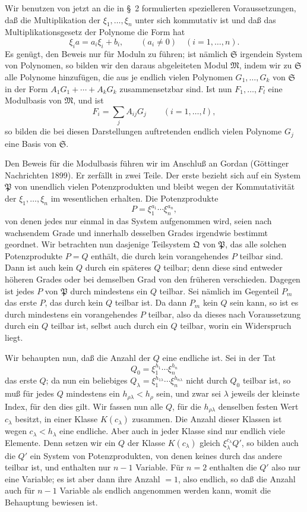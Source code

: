 \documentclass[11pt]{article}
\newcommand{\mM}{\mathfrak{M}}
\providecommand{\mP}{\mathfrak{P}}
\providecommand{\mQ}{\mathfrak{Q}}
\providecommand{\mS}{\mathfrak{S}}
\begin{document}
Wir benutzen von jetzt an die in \S~2 formulierten spezielleren Voraussetzungen, daß die Multiplikation der $\xi_1,\ldots,\xi_n$ unter sich kommutativ ist und daß das Multiplikationsgesetz der Polynome die Form hat
\begin{equation}
 \xi_i a=a_i\xi_i+b_i,
 \qquad (a_i\ne0)\quad(i=1,\ldots,n).
\tag{6}
\end{equation}
Es genügt, den Beweis nur für Moduln zu führen; ist nämlich $\mS$ irgendein System von Polynomen, so bilden wir den daraus abgeleiteten Modul $\mM$, indem wir zu $\mS$ alle Polynome hinzufügen, die aus je endlich vielen Polynomen $G_1,
\ldots,G_k$ von $\mS$ in der Form $A_1G_1+
\cdots+A_kG_k$ zusammensetzbar sind. Ist nun $F_1,\ldots,F_l$ eine Modulbasis von $\mM$, und ist
\[
 F_i=\sum_j A_{ij}G_j\qquad(i=1,\ldots,l),
\]
so bilden die bei diesen Darstellungen auftretenden endlich vielen Polynome $G_j$ eine Basis von $\mS$.

Den Beweis für die Modulbasis führen wir im Anschluß an Gordan (Göttinger Nachrichten 1899). Er zerfällt in zwei Teile. Der erste bezieht sich auf ein System $\mP$ von unendlich vielen Potenzprodukten und bleibt wegen der Kommutativität der $\xi_1,\ldots,\xi_n$ im wesentlichen erhalten. Die Potenzprodukte
\[
 P=\xi_1^{a_1}\cdots\xi_n^{a_n},
\]
von denen jedes nur einmal in das System aufgenommen wird, seien nach wachsendem Grade und innerhalb desselben Grades irgendwie bestimmt geordnet. Wir betrachten nun dasjenige Teilsystem $\mQ$ von $\mP$, das alle solchen Potenzprodukte $P=Q$ enthält, die durch kein vorangehendes $P$ teilbar sind. Dann ist auch kein $Q$ durch ein späteres $Q$ teilbar; denn diese sind entweder höheren Grades oder bei demselben Grad von den früheren verschieden. Dagegen ist jedes $P$ von $\mP$ durch mindestens ein $Q$ teilbar. Sei nämlich im Gegenteil $P_m$ das erste $P$, das durch kein $Q$ teilbar ist. Da dann $P_m$ kein $Q$ sein kann, so ist es durch mindestens ein vorangehendes $P$ teilbar, also da dieses nach Voraussetzung durch ein $Q$ teilbar ist, selbst auch durch ein $Q$ teilbar, worin ein Widerspruch liegt.

Wir behaupten nun, daß die Anzahl der $Q$ eine endliche ist. Sei in der Tat
\[
 Q_0=\xi_1^{h_1}\cdots\xi_n^{h_n}
\]
das erste $Q$; da nun ein beliebiges $Q_\lambda=\xi_1^{h_{1\lambda}}\cdots\xi_n^{h_{n\lambda}}$ nicht durch $Q_0$ teilbar ist, so muß für jedes $Q$ mindestens ein $h_{\rho\lambda}<h_\rho$ sein, und zwar sei $\lambda$ jeweils der kleinste Index, für den dies gilt. Wir fassen nun alle $Q$, für die $h_{\rho\lambda}$ denselben festen Wert $c_\lambda$ besitzt, in einer Klasse $K(c_\lambda)$ zusammen. Die Anzahl dieser Klassen ist wegen $c_\lambda<h_\lambda$ eine endliche. Aber auch in jeder Klasse sind nur endlich viele Elemente. Denn setzen wir ein $Q$ der Klasse $K(c_\lambda)$ gleich $\xi_\lambda^{c_\lambda}Q'$, so bilden auch die $Q'$ ein System von Potenzprodukten, von denen keines durch das andere teilbar ist, und enthalten nur $n-1$ Variable. Für $n=2$ enthalten die $Q'$ also nur eine Variable; es ist aber dann ihre Anzahl $=1$, also endlich, so daß die Anzahl auch für $n-1$ Variable als endlich angenommen werden kann, womit die Behauptung bewiesen ist.
\end{document}
